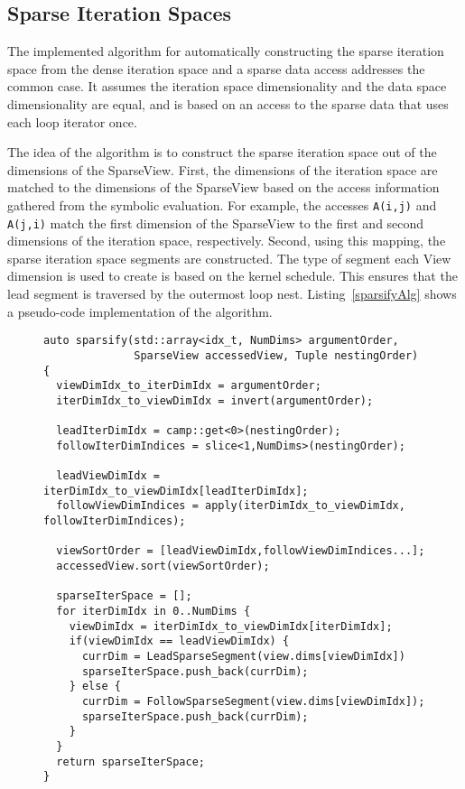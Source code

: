 \subsection{Sparse Iteration Spaces}

The implemented algorithm for automatically constructing the sparse iteration space from the dense iteration space and a sparse data access addresses the common case.
It assumes the iteration space dimensionality and the data space dimensionality are equal, and is based on an access to the sparse data that uses each loop iterator once.


The idea of the algorithm is to construct the sparse iteration space out of the dimensions of the SparseView. 
First, the dimensions of the iteration space are matched to the dimensions of the SparseView based on the access information gathered from the symbolic evaluation.
For example, the accesses \verb.A(i,j). and \verb.A(j,i). match the first dimension of the SparseView to the first and second dimensions of the iteration space, respectively.
Second, using this mapping, the sparse iteration space segments are constructed.
The type of segment each View dimension is used to create is based on the kernel schedule.
This ensures that the lead segment is traversed by the outermost loop nest.
Listing~\ref{sparsifyAlg} shows a pseudo-code implementation of the algorithm.


\begin{figure}
\begin{lstlisting}[caption={Abbreviated algorithm for sparsifying a dense iteration space.}, label=sparsifyAlg]
auto sparsify(std::array<idx_t, NumDims> argumentOrder, 
              SparseView accessedView, Tuple nestingOrder) {
  viewDimIdx_to_iterDimIdx = argumentOrder;
  iterDimIdx_to_viewDimIdx = invert(argumentOrder);

  leadIterDimIdx = camp::get<0>(nestingOrder);
  followIterDimIndices = slice<1,NumDims>(nestingOrder);

  leadViewDimIdx = iterDimIdx_to_viewDimIdx[leadIterDimIdx];
  followViewDimIndices = apply(iterDimIdx_to_viewDimIdx, followIterDimIndices);

  viewSortOrder = [leadViewDimIdx,followViewDimIndices...];
  accessedView.sort(viewSortOrder);

  sparseIterSpace = [];
  for iterDimIdx in 0..NumDims {
    viewDimIdx = iterDimIdx_to_viewDimIdx[iterDimIdx];
    if(viewDimIdx == leadViewDimIdx) {
      currDim = LeadSparseSegment(view.dims[viewDimIdx])
      sparseIterSpace.push_back(currDim);
    } else {
      currDim = FollowSparseSegment(view.dims[viewDimIdx]);
      sparseIterSpace.push_back(currDim);
    }
  }
  return sparseIterSpace;
}
\end{lstlisting}
\end{figure}

